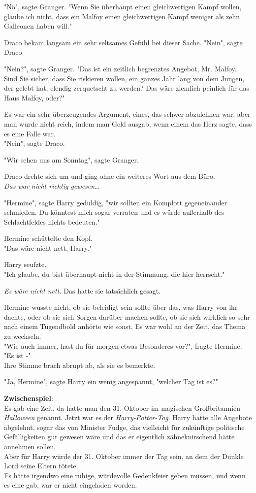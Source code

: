{"Nö", sagte Granger. "Wenn Sie überhaupt einen gleichwertigen Kampf wollen, glaube ich nicht, dass ein Malfoy einen gleichwertigen Kampf weniger als zehn Galleonen haben will."

Draco bekam langsam ein sehr seltsames Gefühl bei dieser Sache. "Nein", sagte Draco.

"Nein?", sagte Granger. "Das ist ein zeitlich begrenztes Angebot, Mr. Malfoy.\\ Sind Sie sicher, dass Sie riskieren wollen, ein ganzes Jahr lang von dem Jungen, der gelebt hat, elendig zerquetscht zu werden? Das wäre ziemlich peinlich für das Haus Malfoy, oder?"

Es war ein sehr überzeugendes Argument, eines, das schwer abzulehnen war, aber man wurde nicht reich, indem man Geld ausgab, wenn einem das Herz sagte, dass es eine Falle war.\\ "Nein", sagte Draco.

"Wir sehen uns am Sonntag", sagte Granger.

Draco drehte sich um und ging ohne ein weiteres Wort aus dem Büro.\\ \emph{Das war nicht richtig gewesen…}

"Hermine", sagte Harry geduldig, "wir sollten ein Komplott gegeneinander schmieden. Du könntest mich sogar verraten und es würde außerhalb des Schlachtfeldes nichts bedeuten."

Hermine schüttelte den Kopf.\\ "Das wäre nicht nett, Harry."

Harry seufzte.\\ "Ich glaube, du bist überhaupt nicht in der Stimmung, die hier herrscht."

\emph{Es wäre nicht nett.} Das hatte sie tatsächlich gesagt.

Hermine wusste nicht, ob sie beleidigt sein sollte über das, was Harry von ihr dachte, oder ob sie sich Sorgen darüber machen sollte, ob sie sich wirklich so sehr nach einem Tugendbold anhörte wie sonst. Es war wohl an der Zeit, das Thema zu wechseln.\\ "Wie auch immer, hast du für morgen etwas Besonderes vor?", fragte Hermine.\\ "Es ist -"\\ Ihre Stimme brach abrupt ab, als sie es bemerkte.

"Ja, Hermine", sagte Harry ein wenig angespannt, "welcher Tag ist es?"

\textbf{Zwischenspiel}:\\ Es gab eine Zeit, da hatte man den 31. Oktober im magischen Großbritannien \emph{Halloween} genannt. Jetzt war es der \emph{Harry-Potter-Tag}. Harry hatte alle Angebote abgelehnt, sogar das von Minister Fudge, das vielleicht für zukünftige politische Gefälligkeiten gut gewesen wäre und das er eigentlich zähneknirschend hätte annehmen sollen.\\ Aber für Harry würde der 31. Oktober immer der Tag sein, an dem der Dunkle Lord seine Eltern tötete.\\ Es hätte irgendwo eine ruhige, würdevolle Gedenkfeier geben müssen, und wenn es eine gab, war er nicht eingeladen worden.

}
